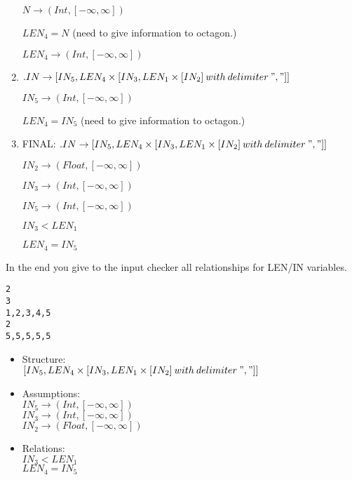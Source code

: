 \documentclass[11pt]{article}
\begin{document}
\begin{enumerate}
  $N \rightarrow (Int, [-\infty, \infty])$
  
  $LEN_4 = N$ (need to give information to octagon.)
  
  $LEN_4 \rightarrow (Int, [-\infty, \infty])$
  
  \item $.IN \rightarrow [IN_5, LEN_4 \times [IN_3, LEN_1 \times [IN_2]\:with\:delimiter\:","]]$
  
  $IN_5 \rightarrow (Int, [-\infty, \infty])$
  
  $LEN_4 = IN_5$ (need to give information to octagon.)
  
  \item FINAL: $.IN \rightarrow [IN_5, LEN_4 \times [IN_3, LEN_1 \times [IN_2]\:with\:delimiter\:","]]$
  
  $IN_2 \rightarrow (Float, [-\infty, \infty])$
  
  $IN_3 \rightarrow (Int, [-\infty, \infty])$
  
  $IN_5 \rightarrow (Int, [-\infty, \infty])$
  
  $IN_3 < LEN_1$
  
  $LEN_4 = IN_5$
\end{enumerate}

In the end you give to the input checker all relationships for LEN/IN variables.

\begin{lstlisting}[numbers=none]
2
3
1,2,3,4,5
2
5,5,5,5,5
\end{lstlisting}



\begin{itemize}
  \item Structure:\\
  $[IN_5, LEN_4 \times [IN_3, LEN_1 \times [IN_2]\:with\:delimiter\:","]]$
  \item Assumptions:\\
  $IN_5 \rightarrow (Int, [-\infty, \infty])$\\
  $IN_3 \rightarrow (Int, [-\infty, \infty])$\\
  $IN_2 \rightarrow (Float, [-\infty, \infty])$
  \item Relations:\\
  $IN_3 < LEN_1$\\
  $LEN_4 = IN_5$\\
\end{itemize}
\end{document}
